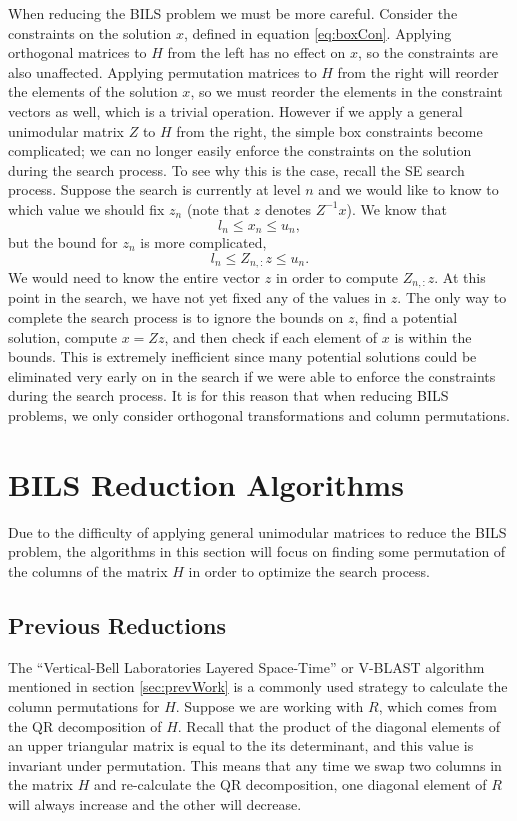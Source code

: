 \documentclass[12pt,Bold,letterpaper]{mcgilletdclass}
\newcommand{\vsp}{\vspace{\baselineskip}}
\begin{document}
When reducing the BILS problem we must be more careful. Consider the constraints on the solution $x$, defined in equation \eqref{eq:boxCon}. Applying orthogonal matrices to $H$ from the left has no effect on $x$, so the constraints are also unaffected. Applying permutation matrices to $H$ from the right will reorder the elements of the solution $x$, so we must reorder the elements in the constraint vectors as well, which is a trivial operation. However if we apply a general unimodular matrix $Z$ to $H$ from the right, the simple box constraints become complicated; we can no longer easily enforce the constraints on the solution during the search process. To see why this is the case, recall the SE search process. Suppose the search is currently at level $n$ and we would like to know to which value we should fix $z_{n}$ (note that $z$ denotes $Z^{-1}x$). We know that $$l_{n} \le x_{n} \le u_{n},$$ but the bound for $z_{n}$ is more complicated, $$l_{n} \le Z_{n,:}z \le u_{n}.$$ We would need to know the entire vector $z$ in order to compute $Z_{n,:}z$. At this point in the search, we have not yet fixed any of the values in $z$. The only way to complete the search process is to ignore the bounds on $z$, find a potential solution, compute $x = Zz$, and then check if each element of $x$ is within the bounds. This is extremely inefficient since many potential solutions could be eliminated very early on in the search if we were able to enforce the constraints during the search process. It is for this reason that when reducing BILS problems, we only consider orthogonal transformations and column permutations.

\vsp \section{BILS Reduction Algorithms} \label{sec:BILSReduction}

Due to the difficulty of applying general unimodular matrices to reduce the BILS problem, the algorithms in this section will focus on finding some permutation of the columns of the matrix $H$ in order to optimize the search process.

\vsp \subsection{Previous Reductions}

The ``Vertical-Bell Laboratories Layered Space-Time'' or V-BLAST algorithm \cite{FosGVW99} mentioned in section \ref{sec:prevWork} is a commonly used strategy to calculate the column permutations for $H$. Suppose we are working with $R$, which comes from the QR decomposition of $H$. Recall that the product of the diagonal elements of an upper triangular matrix is equal to the its determinant, and this value is invariant under permutation. This means that any time we swap two columns in the matrix $H$ and re-calculate the QR decomposition, one diagonal element of $R$ will always increase and the other will decrease.
\end{document}

